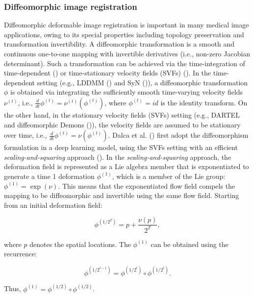 \documentclass[times,twocolumn,final]{elsarticle}
\begin{document}
\subsubsection{Diffeomorphic image registration}
\label{sec:ss_diff}
Diffeomorphic deformable image registration is important in many medical image applications, owing to its special properties including topology preservation and transformation invertibility. A diffeomorphic transformation is a smooth and continuous one-to-one mapping with invertible derivatives (i.e., non-zero Jacobian determinant). Such a transformation can be achieved via the time-integration of time-dependent (\cite{beg2005computing, avants2008symmetric}) or time-stationary velocity fields (SVFs) (\cite{arsigny2006log, ashburner2007fast, vercauteren2009diffeomorphic, hernandez2009registration}). In the time-dependent setting (e.g., LDDMM (\cite{beg2005computing}) and SyN (\cite{avants2008symmetric})), a diffeomorphic transformation $\phi$ is obtained via integrating the sufficiently smooth time-varying velocity fields $\nu^{(t)}$, i.e., $\frac{d}{dt}\phi^{(t)}=\nu^{(t)}(\phi^{(t)})$, where $\phi^{(t)} = id$ is the identity transform. On the other hand, in the stationary velocity fields (SVFs) setting (e.g., DARTEL \cite{ashburner2007fast} and diffeomorphic Demons (\cite{vercauteren2009diffeomorphic})), the velocity fields are assumed to be stationary over time, i.e., $\frac{d}{dt}\phi^{(t)}=\nu(\phi^{(t)})$. Dalca et al. (\cite{dalca2019unsupervised}) first adopt the diffeomorphism formulation in a deep learning model, using the SVFs setting with an efficient \textit{scaling-and-squaring} approach (\cite{arsigny2006log}). In the \textit{scaling-and-squaring} approach, the deformation field is represented as a Lie algebra member that is exponentiated to generate a time 1 deformation $\phi^{(1)}$, which is a member of the Lie group: $\phi^{(1)} = \exp(\nu)$. This means that the exponentiated flow field compels the mapping to be diffeomorphic and invertible using the same flow field. Starting from an initial deformation field:
\begin{linenomath}
\begin{equation}
   \phi^{(1/2^T)} = p + \frac{\nu(p)}{2^T},
\end{equation}
\end{linenomath}
where $p$ denotes the spatial locations. The $\phi^{(1)}$ can be obtained using the recurrence:
\begin{linenomath}
\begin{equation}
\label{eqn:sqring}
    \phi^{(1/2^{t-1})} = \phi^{(1/2^{t})} \circ \phi^{(1/2^{t})}.
\end{equation}
\end{linenomath}
Thus, $\phi^{(1)} = \phi^{(1/2)} \circ \phi^{(1/2)}$.
\end{document}
